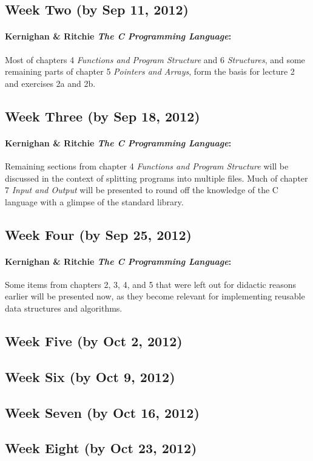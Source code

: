 \documentclass[a4paper]{article}
\begin{document}
\subsection*{Week Two (by Sep 11, 2012)}

\paragraph{Kernighan \& Ritchie \emph{The C Programming Language}:}
Most of chapters 4 \emph{Functions and Program Structure} and 6 \emph{Structures}, and some remaining parts of chapter 5 \emph{Pointers and Arrays}, form the basis for lecture 2 and exercises 2a and 2b.


\subsection*{Week Three (by Sep 18, 2012)}

\paragraph{Kernighan \& Ritchie \emph{The C Programming Language}:}
Remaining sections from chapter 4 \emph{Functions and Program Structure} will be discussed in the context of splitting programs into multiple files.
Much of chapter 7 \emph{Input and Output} will be presented to round off the knowledge of the C language with a glimpse of the standard library.


\subsection*{Week Four (by Sep 25, 2012)}

\paragraph{Kernighan \& Ritchie \emph{The C Programming Language}:}
Some items from chapters 2, 3, 4, and 5 that were left out for didactic reasons earlier will be presented now, as they become relevant for implementing reusable data structures and algorithms.

\subsection*{Week Five (by Oct 2, 2012)}

\subsection*{Week Six (by Oct 9, 2012)}

\subsection*{Week Seven (by Oct 16, 2012)}

\subsection*{Week Eight (by Oct 23, 2012)}
\end{document}

